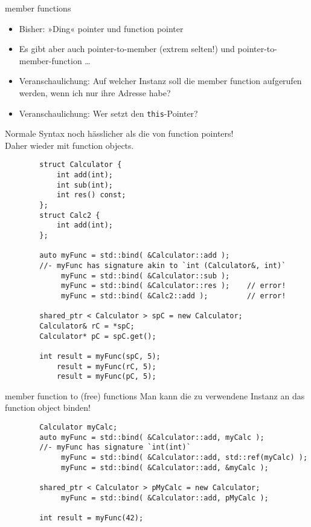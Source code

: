 \begin{frame}[fragile]{ member functions }
	\begin{itemize}
		\item Bisher: »Ding« pointer und function pointer
		\item Es gibt aber auch pointer-to-member (extrem selten!) und pointer-to-member-function \dots
		\item Veranschaulichung: Auf welcher Instanz soll die member function aufgerufen werden, wenn ich nur ihre Adresse habe?
		\item Veranschaulichung: Wer setzt den \texttt{this}-Pointer?
	\end{itemize}
	
	\pause
	
	Normale Syntax noch hässlicher als die von function pointers!	\\
	Daher wieder mit function objects.
	
	\begin{lstlisting}
		struct Calculator {
			int add(int);
			int sub(int);
			int res() const;
		};
		struct Calc2 {
			int add(int);
		};
		
		auto myFunc = std::bind( &Calculator::add );
		//- myFunc has signature akin to `int (Calculator&, int)`
		     myFunc = std::bind( &Calculator::sub );
		     myFunc = std::bind( &Calculator::res );    // error!
		     myFunc = std::bind( &Calc2::add );         // error!
		
		shared_ptr < Calculator > spC = new Calculator;
		Calculator& rC = *spC;
		Calculator* pC = spC.get();
		
		int result = myFunc(spC, 5);
		    result = myFunc(rC, 5);
		    result = myFunc(pC, 5);
	\end{lstlisting}
\end{frame}

\begin{frame}[fragile]{ member function to (free) functions }
	Man kann die zu verwendene Instanz an das function object binden!
	
	\begin{lstlisting}
		Calculator myCalc;
		auto myFunc = std::bind( &Calculator::add, myCalc );
		//- myFunc has signature `int(int)`
		     myFunc = std::bind( &Calculator::add, std::ref(myCalc) );
		     myFunc = std::bind( &Calculator::add, &myCalc );
			 
		shared_ptr < Calculator > pMyCalc = new Calculator;
		     myFunc = std::bind( &Calculator::add, pMyCalc );
			 
		int result = myFunc(42);
	\end{lstlisting}
\end{frame}


